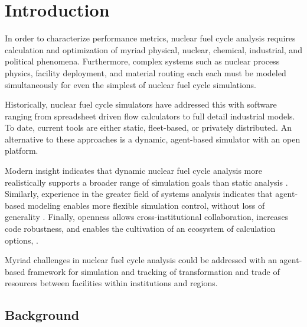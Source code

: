 
\section{Introduction}


In order to characterize performance metrics, nuclear fuel cycle analysis 
requires calculation and optimization of myriad physical, nuclear, chemical, 
industrial, and political phenomena. Furthermore, complex systems such as 
nuclear process physics, facility deployment, and material routing each each 
must be modeled simultaneously for even the simplest of nuclear fuel cycle 
simulations. 


Historically, nuclear fuel cycle simulators have addressed this with software 
ranging from spreadsheet driven flow calculators to full detail industrial 
models. To date, current tools are either static, fleet-based, or 
privately distributed. An alternative to these approaches is a dynamic, 
agent-based simulator with an open platform. 

Modern insight indicates that dynamic nuclear fuel cycle analysis more 
realistically supports a broader range of simulation goals than static analysis 
\cite{piet_dynamic_2011}. Similarly, experience in the greater field of systems 
analysis indicates that agent-based modeling enables more flexible simulation 
control, without loss of generality \cite{thatpapermattsent}. Finally, 
openness allows cross-institutional collaboration, increases code robustness, 
and enables the cultivation of an ecosystem of calculation options, 
\cite{softwarecarpentryresource}.  

Myriad challenges in nuclear fuel cycle analysis could be 
addressed with an agent-based framework for simulation and tracking of 
transformation and trade of resources between facilities within institutions 
and regions.  

\subsection{Background}

